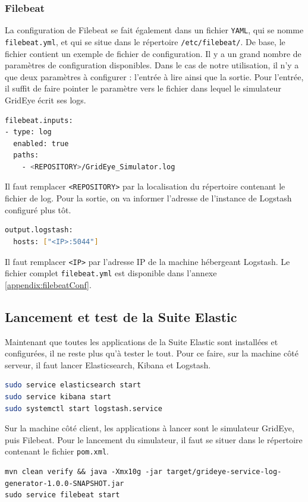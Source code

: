 \documentclass[paper=a4, fontsize=11pt]{scrartcl}
\begin{document}
\subsubsection{Filebeat}
La configuration de Filebeat se fait également dans un fichier \verb,YAML,, qui se nomme \verb,filebeat.yml,, et qui se situe dans le répertoire \verb,/etc/filebeat/,. De base, le fichier contient un exemple de fichier de configuration. Il y a un grand nombre de paramètres de configuration disponibles. Dans le cas de notre utilisation, il n'y a que deux paramètres à configurer : l'entrée à lire ainsi que la sortie.
Pour l'entrée, il suffit de faire pointer le paramètre vers le fichier dans lequel le simulateur GridEye écrit ses logs.
\begin{lstlisting}[language=bash]
filebeat.inputs:
- type: log
  enabled: true
  paths:
    - <REPOSITORY>/GridEye_Simulator.log
\end{lstlisting}
Il faut remplacer \verb,<REPOSITORY>, par la localisation du répertoire contenant le fichier de log.
Pour la sortie, on va informer l'adresse de l'instance de Logstash configuré plus tôt.
\begin{lstlisting}[language=bash]
output.logstash:
  hosts: ["<IP>:5044"]
\end{lstlisting}
Il faut remplacer \verb,<IP>, par l'adresse IP de la machine hébergeant Logstash.
Le fichier complet \verb,filebeat.yml, est disponible dans l'annexe \ref{appendix:filebeatConf}.

\subsection{Lancement et test de la Suite Elastic}
Maintenant que toutes les applications de la Suite Elastic sont installées et configurées, il ne reste plus qu'à tester le tout. Pour ce faire, sur la machine côté serveur, il faut lancer Elasticsearch, Kibana et Logstash.
\begin{lstlisting}[language=bash]
sudo service elasticsearch start
sudo service kibana start
sudo systemctl start logstash.service
\end{lstlisting}

Sur la machine côté client, les applications à lancer sont le simulateur GridEye, puis Filebeat. Pour le lancement du simulateur, il faut se situer dans le répertoire contenant le fichier \verb,pom.xml,.
\begin{lstlisting}
mvn clean verify && java -Xmx10g -jar target/grideye-service-log-generator-1.0.0-SNAPSHOT.jar
sudo service filebeat start
\end{lstlisting}
\end{document}
